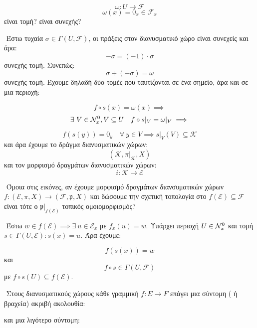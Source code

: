 $$\omega: U \longrightarrow \mathcal{F}$$
$$\omega(x) = 0_x \in \mathcal{F}_x$$ είναι τομή? είναι συνεχής?

$ $\newline
Έστω τυχαία $\sigma \in \Gamma(U,\mathcal{F})$, οι πράξεις στον διανυσματικό χώρο είναι συνεχείς και άρα:
$$-\sigma = (-1) \cdot \sigma $$ συνεχής τομή. Συνεπώς:
$$\sigma + (-\sigma) = \omega$$ συνεχής τομή. Έχουμε δηλαδή δύο τομές που ταυτίζονται σε ένα σημείο, άρα και σε μια περιοχή:

$$f\circ s(x) = \omega(x) \implies$$
$$\exists \ V \in \mathcal{N}^0_x, V\subseteq U \quad f\circ s|_V = \omega|_V \implies $$

$$f(s(y)) = 0_y \quad \forall \ y \in V \implies s|_V(V)\subseteq \mathcal{K}$$ και άρα έχουμε το δράγμα διανυσματικών χώρων:
$$(\mathcal{K},\pi|_{\mathcal{K}}, X)$$ και τον μορφισμό δραγμάτων διανυσματικών χώρων:
$$i:\mathcal{K}\longrightarrow \mathcal{E}$$

\vspace*{0.3cm}
$ $\newline
Όμοια στις εικόνες, αν έχουμε μορφισμό δραγμάτων διανσυματικών χώρων $f:(\mathcal{E},\pi,X)\longrightarrow (\mathcal{F},\mathfrak{p},X)$ και δώσουμε την σχετική τοπολογία στο $f(\mathcal{E})\subseteq \mathcal{F}$ είναι τότε ο $\mathfrak{p}|_{f(\mathcal{E})}$ τοπικός ομοιομορφισμός?

$ $\newline
Έστω $w \in f(\mathcal{E}) \implies \exists \ u \in \mathcal{E}_x$ με $f_x(u) = w$. Υπάρχει περιοχή $U \in \mathcal{N}^0_x$ και τομή $s \in \Gamma(U,\mathcal{E}): s(x) = u$. Άρα έχουμε:

$$f(s(x)) = w$$ και 
$$f\circ s \in \Gamma(U,\mathcal{F})$$ με $f \circ s (U)\subseteq f(\mathcal{E})$.

\vspace*{0.3cm}
$ $\newline
Στους διανυσματικούς χώρους κάθε γραμμική $f:E\longrightarrow F$ επάγει μια σύντομη ( ή βραχεία) ακριβή ακολουθία:
\begin{figure}[H]
    \centering
\end{figure}
\noindent και μια λιγότερο σύντομη:
\begin{figure}[H]
    \centering
\end{figure}

